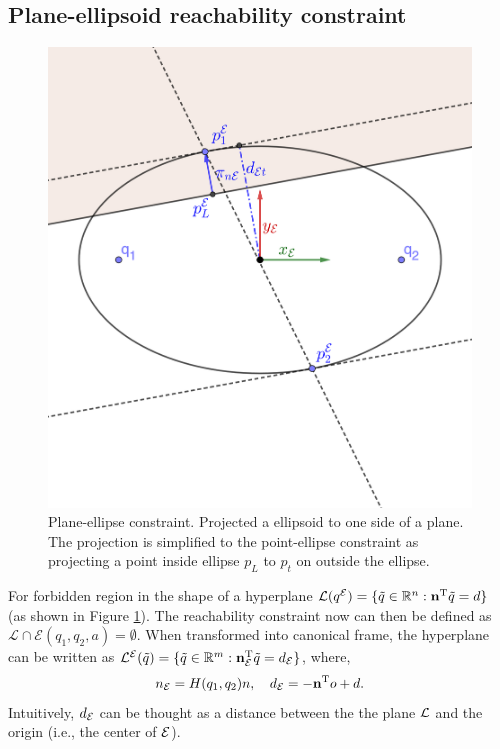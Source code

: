 \documentclass[journal]{IEEEtran}  %
\begin{document}
\subsection{Plane-ellipsoid reachability constraint}\label{sec:ellipsoide-plane}

\begin{figure}[htbp]
\begin{center}
\includegraphics[width=0.6\linewidth, trim = 0.3cm 1cm 0.3cm 1cm, clip]{Ellipse2line_V2}
\caption{Plane-ellipse constraint. Projected a ellipsoid to one side of a plane. The projection is simplified to the point-ellipse constraint as projecting a point inside ellipse $p_{L}$ to $p_{t}$ on outside the ellipse.}
\label{fig:Ellipse-to-plane}
\end{center}
\end{figure}

For forbidden region in the shape of a hyperplane $\mathcal{L}({q^{\mathcal{E}}}) = \{\tilde{q}\in\mathbb{R}^n: \mathbf{n}^\mathrm{T} \tilde{q} = d\}$ (as shown in Figure \ref{fig:Ellipse-to-plane}). The reachability constraint now can then be defined as $\mathcal{L} \cap \mathcal{E}(q_1,q_2,a) = \emptyset$. When transformed into canonical frame, the hyperplane can be written as ${\mathcal{L}^{\mathcal{E}}}(\tilde{q}) = \{  \tilde{q}\in\mathbb{R}^m:  \mathbf{n}_{\mathcal{E}}^\mathrm{T} \tilde{q} = d_{\mathcal{E}}\}$, where,
  \begin{equation}
    n_{\mathcal{E}} = H(q_1,q_2)n, \quad d_{\mathcal{E}} =-\mathbf{n}^\mathrm{T} o + d.
\end{equation}
Intuitively, $d_{\mathcal{E}}$ can be thought as a distance between the the plane $\mathcal{L}$ and the origin (i.e., the center of $\mathcal{E}$).
\end{document}
